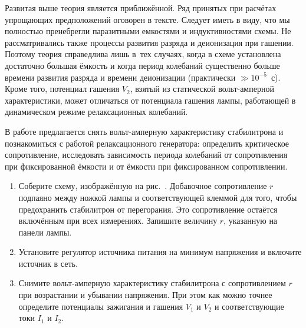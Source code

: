 Развитая выше теория является приближённой. Ряд принятых при расчётах упрощающих предположений оговорен в тексте.
Следует иметь в виду, что мы полностью пренебрегли паразитными емкостями и индуктивностями схемы. Не рассматривались
также процессы развития разряда и деионизация при гашении. Поэтому теория справедлива лишь в~тех случаях, когда в схеме
установлена достаточно большая ёмкость и когда период колебаний существенно больше времени развития разряда и времени
деионизации (практически $\gg10^{-5}$~с). Кроме того, потенциал гашения $V_2$, взятый из статической вольт-амперной
характеристики, может отличаться от потенциала гашения лампы, работающей в динамическом режиме релаксационных колебаний.

\begin{lab:task}

В работе предлагается снять вольт-амперную характеристику стабилитрона и познакомиться с работой релаксационного
генератора: определить критическое сопротивление, исследовать зависимость периода колебаний от сопротивления при
фиксированной ёмкости и от ёмкости при фиксированном сопротивлении.
	\begin{enumerate}
\begin{figure}[h!] 
	\caption{Схема установки для~изучения характеристик стабилитрона}
\end{figure}

		\item Соберите схему, изображённую на рис.~. Добавочное сопротивление $r$ подпаяно между ножкой лампы и соответствующей
клеммой для того, чтобы предохранить стабилитрон от перегорания. Это сопротивление остаётся включённым при всех
измерениях. Запишите величину $r$, указанную на панели лампы.

		\item Установите регулятор источника питания на минимум напряжения и включите источник в сеть.

		\item Снимите вольт-амперную характеристику стабилитрона с сопротивлением $r$ при возрастании и убывании напряжения. При
этом как можно точнее определите потенциалы зажигания и гашения $V_1$ и $V_2$ и соответствующие токи $I_1$ и $I_2$.



\end{enumerate}
\end{lab:task}
